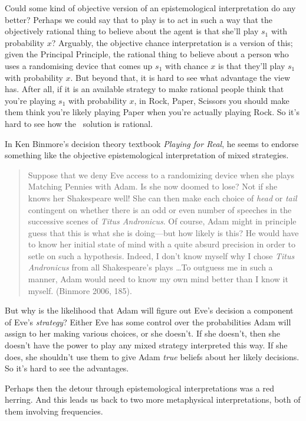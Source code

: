 Could some kind of objective version of an epistemological interpretation do any better? Perhaps we could say that to play  is to act in such a way that the objectively rational thing to believe about the agent is that she'll play $s_1$ with probability $x$? Arguably, the objective chance interpretation is a version of this; given the Principal Principle, the rational thing to believe about a person who uses a randomising device that comes up $s_1$ with chance $x$ is that they'll play $s_1$ with probability $x$. But beyond that, it is hard to see what advantage the view has. After all, if it is an available strategy to make rational people think that you're playing $s_1$ with probability $x$, in Rock, Paper, Scissors you should make them think you're likely playing Paper when you're actually playing Rock. So it's hard to see how the \eqm\ solution is rational.

In Ken Binmore's decision theory textbook \textit{Playing for Real}, he seems to endorse something like the objective epistemological interpretation of mixed strategies.

\begin{quote}
Suppose that we deny Eve access to a randomizing device when she plays Matching Pennies with Adam. Is she now doomed to lose? Not if she knows her Shakespeare well! She can then make each choice of \textit{head} or \textit{tail} contingent on whether there is an odd or even number of speeches in the successive scenes of \textit{Titus Andronicus}. Of course, Adam might in principle guess that this is what she is doing---but how likely is this? He would have to know her initial state of mind with a quite absurd  precision in order to setle on such a hypothesis. Indeed, I don't know myself why I chose \textit{Titus Andronicus} from all Shakespeare's plays \dots To outguess me in such a manner, Adam would need to know my own mind better than I know it myself. (Binmore 2006, 185).
\end{quote}

\noindent But why is the likelihood that Adam will figure out Eve's decision a component of Eve's \textit{strategy}? Either Eve has some control over the probabilities Adam will assign to her making various choices, or she doesn't. If she doesn't, then she doesn't have the power to play any mixed strategy interpreted this way. If she does, she shouldn't use them to give Adam \textit{true} beliefs about her likely decisions. So it's hard to see the advantages.

Perhaps then the detour through epistemological interpretations was a red herring. And this leads us back to two more metaphysical interpretations, both of them involving frequencies.

